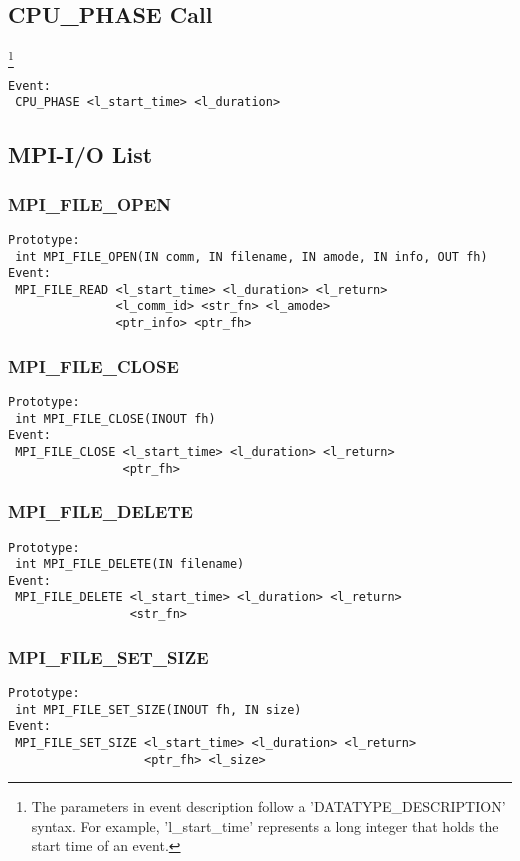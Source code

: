 \documentclass[9pt]{article}
\begin{document}
\subsection{CPU\_PHASE Call}\footnote{The parameters in event description follow a 'DATATYPE\_DESCRIPTION' syntax. For example, 'l\_start\_time' represents a long integer that holds the start time of an event.}
\label{sec:CPUPHASECall}
\begin{verbatim}
Event:
 CPU_PHASE <l_start_time> <l_duration>
\end{verbatim}

\subsection{MPI-I/O List}
\label{sec:MPIIOList}

\subsubsection{MPI\_FILE\_OPEN}
\label{sec:MPIFILEOPEN}
\begin{verbatim}
Prototype: 
 int MPI_FILE_OPEN(IN comm, IN filename, IN amode, IN info, OUT fh)
Event: 
 MPI_FILE_READ <l_start_time> <l_duration> <l_return> 
               <l_comm_id> <str_fn> <l_amode> 
               <ptr_info> <ptr_fh>
\end{verbatim}

\subsubsection{MPI\_FILE\_CLOSE}
\label{sec:MPIFILECLOSE}
\begin{verbatim}
Prototype: 
 int MPI_FILE_CLOSE(INOUT fh)
Event: 
 MPI_FILE_CLOSE <l_start_time> <l_duration> <l_return> 
                <ptr_fh>
\end{verbatim}

\subsubsection{MPI\_FILE\_DELETE}
\label{sec:MPIFILEDELETE}
\begin{verbatim}
Prototype: 
 int MPI_FILE_DELETE(IN filename)
Event: 
 MPI_FILE_DELETE <l_start_time> <l_duration> <l_return>
                 <str_fn>
\end{verbatim}

\subsubsection{MPI\_FILE\_SET\_SIZE}
\label{sec:MPIFILESETSIZE}
\begin{verbatim}
Prototype: 
 int MPI_FILE_SET_SIZE(INOUT fh, IN size)
Event: 
 MPI_FILE_SET_SIZE <l_start_time> <l_duration> <l_return>
                   <ptr_fh> <l_size>
\end{verbatim}
\end{document}
